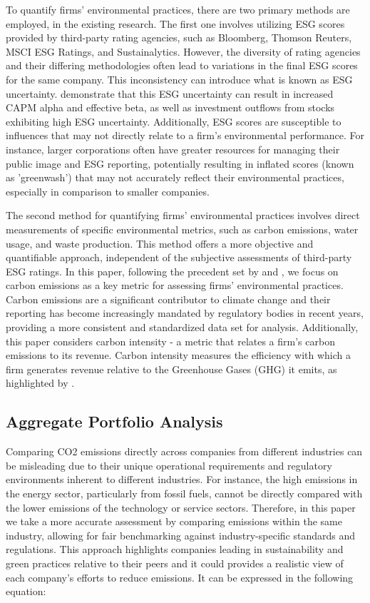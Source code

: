 \documentclass[12pt]{article}
\begin{document}
To quantify firms' environmental practices, there are two primary methods are employed, in the existing research. The first one involves utilizing ESG scores provided by third-party rating agencies, such as Bloomberg, Thomson Reuters, MSCI ESG Ratings, and Sustainalytics. However, the diversity of rating agencies and their differing methodologies often lead to variations in the final ESG scores for the same company. This inconsistency can introduce what is known as ESG uncertainty. \cite{avramov2022sustainable} demonstrate that this ESG uncertainty can result in increased CAPM alpha and effective beta, as well as investment outflows from stocks exhibiting high ESG uncertainty. Additionally, ESG scores are susceptible to influences that may not directly relate to a firm's environmental performance. For instance, larger corporations often have greater resources for managing their public image and ESG reporting, potentially resulting in inflated scores (known as 'greenwash') that may not accurately reflect their environmental practices, especially in comparison to smaller companies.

The second method for quantifying firms' environmental practices involves direct measurements of specific environmental metrics, such as carbon emissions, water usage, and waste production. This method offers a more objective and quantifiable approach, independent of the subjective assessments of third-party ESG ratings. In this paper, following the precedent set by \cite{bolton2021investors} and \cite{ardia2022climate}, we focus on carbon emissions as a key metric for assessing firms' environmental practices. Carbon emissions are a significant contributor to climate change and their reporting has become increasingly mandated by regulatory bodies in recent years, providing a more consistent and standardized data set for analysis. Additionally, this paper considers carbon intensity - a metric that relates a firm's carbon emissions to its revenue. Carbon intensity measures the efficiency with which a firm generates revenue relative to the Greenhouse Gases (GHG) it emits, as highlighted by \cite{ilhan2021carbon}. 

\subsection{Aggregate Portfolio Analysis}
Comparing CO2 emissions directly across companies from different industries can be misleading due to their unique operational requirements and regulatory environments inherent to different industries. For instance, the high emissions in the energy sector, particularly from fossil fuels, cannot be directly compared with the lower emissions of the technology or service sectors. Therefore, in this paper we take a more accurate assessment by comparing emissions within the same industry, allowing for fair benchmarking against industry-specific standards and regulations. This approach highlights companies leading in sustainability and green practices relative to their peers and it could provides a realistic view of each company's efforts to reduce emissions. It can be expressed in the following equation:
\end{document}
